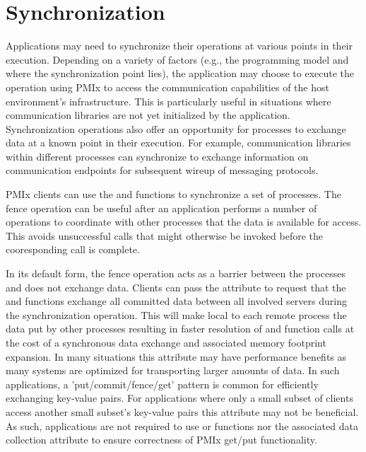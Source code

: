 \chapter{Synchronization}
\label{chap:api_sync}

Applications may need to synchronize their operations at various points in
their execution. Depending on a variety of factors (e.g., the programming
model and where the synchronization point lies), the application may choose to
execute the operation using \ac{PMIx} to access the communication capabilities
of the host environment's infrastructure. This is particularly useful in
situations where communication libraries are not yet initialized by the application.
Synchronization operations also offer an opportunity for processes to exchange
data at a known point in their execution.  For example, communication libraries within
different processes can synchronize to exchange information on communication endpoints
for subsequent wireup of messaging protocols.

\ac{PMIx} clients can use the  and  functions 
to synchronize a set of processes.  The fence operation can be useful after an application
performs a number of  operations to coordinate with other processes that the
data is available for access.   This avoids unsuccessful  calls that might
otherwise be invoked before the cooresponding  call is complete.

In its default form, the fence operation acts as a barrier between the processes and does not exchange data.
Clients can pass the  attribute to request 
that the  and  functions exchange all committed 
data between all involved servers during the synchronization operation.
This will make local to each remote process the data put by other processes resulting 
in faster resolution of  and  function calls at 
the cost of a synchronous data exchange and associated memory footprint expansion.
In many situations 
this attribute may have performance benefits as many systems are optimized for transporting 
larger amounts of data.  In such applications, a 'put/commit/fence/get' 
pattern is common for efficiently exchanging key-value pairs.  
For applications where only a small subset of clients access another small subset's key-value pairs 
this attribute may not be beneficial.  As such, applications are not required to use
 or  functions nor the associated data collection
attribute to ensure correctness of \ac{PMIx} get/put functionality.


